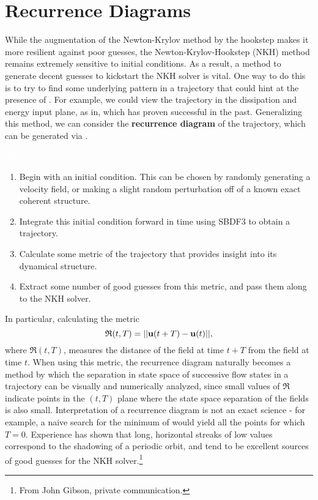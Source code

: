  \section{Recurrence Diagrams}
 
 While the augmentation of the Newton-Krylov method by the hookstep makes it more resilient against poor guesses, the Newton-Krylov-Hookstep (NKH) method remains extremely sensitive to initial conditions. As a result, a method to generate decent guesses to kickstart the NKH solver is vital. One way to do this is to try to find some underlying pattern in a trajectory that could hint at the presence of \ecs. For example, we could view the trajectory in the dissipation and energy input plane, as in, which has proven successful in the past. Generalizing this method, we can consider the {\bf recurrence diagram} of the trajectory, which can be generated via . \\
 
  \begin{algorithm}\label{alg:rec}
  \textcolor{white}{haha}
 \begin{enumerate}
 \item Begin with an initial condition. This can be chosen by randomly generating a velocity field, or making a slight random perturbation off of a known exact coherent structure.
 \item Integrate this initial condition forward in time using SBDF3 to obtain a trajectory. 
 \item Calculate some metric of the trajectory that provides insight into its dynamical structure.
 \item Extract some number of good guesses from this metric, and pass them along to the NKH solver.
 \end{enumerate}
 \end{algorithm} 
In particular, calculating the metric  
\begin{equation}\label{eq:recurrenceEQ}
 \mathfrak{R}(t,T) = ||\mathbf{u}(t+T) - \mathbf{u}(t)||,
 \end{equation}
where $\mathfrak{R}(t,T)$, measures the distance of the field at time $t+T$ from the field at time $t$. When using this metric, the recurrence diagram naturally becomes a method by which the separation in state space of successive flow states in a trajectory can be visually and numerically analyzed, since small values of $\mathfrak{R}$ indicate points in the $(t,T)$ plane where the state space separation of the fields is also small. Interpretation of a recurrence diagram is not an exact science - for example, a naive search for the minimum of  would yield all the points for which $T=0$. Experience has shown that long, horizontal streaks of low values correspond to the shadowing of a periodic orbit, and tend to be excellent sources of good guesses for the NKH solver.\footnote{From John Gibson, private communication.} \\
 
